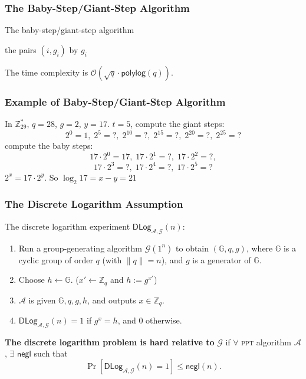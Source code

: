 \begin{frame}\frametitle{The Baby-Step/Giant-Step Algorithm}
\begin{figure}
\begin{center}

\end{center}
\end{figure}
\begin{algorithm}[H]
\DontPrintSemicolon
\caption{The baby-step/giant-step algorithm}
\BlankLine

\; 
\KwS the pairs $(i,g_i)$ by $g_i$\;
\end{algorithm}
The time complexity is $\mathcal{O}(\sqrt{q}\cdot \mathsf{polylog}(q))$.
\end{frame}
\begin{frame}\frametitle{Example of Baby-Step/Giant-Step Algorithm}
\begin{exampleblock}{In $\mathbb{Z}^*_{29}$, $q=28$, $g=2$, $y=17$.}
$t=5$, compute the giant steps:
\[2^0=1,\; 2^5=?,\; 2^{10}=?,\; 2^{15}=?,\; 2^{20}=?,\; 2^{25}=? \]
compute the baby steps:
\[17\cdot 2^0=17,\; 17\cdot 2^1=?,\; 17\cdot 2^2=?,\]
\[ 17\cdot 2^3=?,\; 17\cdot 2^4=?,\; 17\cdot 2^5=?\]
$2^{x} = 17\cdot 2^y$. So $\log_2 17=x-y=21$
\end{exampleblock}
\end{frame}
\begin{frame}\frametitle{The Discrete Logarithm Assumption}
The discrete logarithm experiment $\mathsf{DLog}_{\mathcal{A},\mathcal{G}}(n)$:
\begin{enumerate}
\item Run a group-generating algorithm $\mathcal{G}(1^n)$ to obtain $(\mathbb{G},q,g)$, where $\mathbb{G}$ is a cyclic group of order $q$ (with $\|q\|=n$), and $g$ is a generator of $\mathbb{G}$.
\item Choose $h \gets \mathbb{G}$. ($x' \gets \mathbb{Z}_q$ and $h := g^{x'}$)
\item $\mathcal{A}$ is given $\mathbb{G}, q, g, h$, and outputs $x \in \mathbb{Z}_q$.
\item $\mathsf{DLog}_{\mathcal{A},\mathcal{G}}(n) = 1$ if $g^x = h$, and 0 otherwise. 
\end{enumerate}
\begin{definition}
\textbf{The discrete logarithm problem is hard relative to} $\mathcal{G}$ if $\forall$ \textsc{ppt} algorithm $\mathcal{A}$, $\exists$ $\mathsf{negl}$ such that
\[ \Pr[\mathsf{DLog}_{\mathcal{A},\mathcal{G}}(n)=1] \le \mathsf{negl}(n).\]
\end{definition}
\end{frame}
